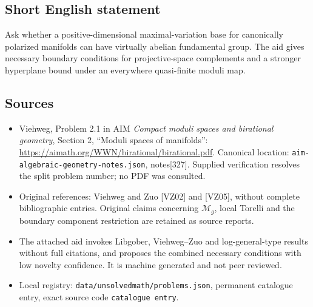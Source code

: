 \documentclass[11pt]{article}
\begin{document}
\subsection{Short English statement}
Ask whether a positive-dimensional maximal-variation base for canonically polarized manifolds can have virtually abelian fundamental group. The aid gives necessary boundary conditions for projective-space complements and a stronger hyperplane bound under an everywhere quasi-finite moduli map.
\subsection{Sources}
\begin{itemize}
\item Viehweg, Problem 2.1 in AIM \emph{Compact moduli spaces and birational geometry}, Section 2, ``Moduli spaces of manifolds'': \url{https://aimath.org/WWN/birational/birational.pdf}. Canonical location: \texttt{aim-algebraic-geometry-notes.json}, notes[327]. Supplied verification resolves the split problem number; no PDF was consulted.
\item Original references: Viehweg and Zuo [VZ02] and [VZ05], without complete bibliographic entries. Original claims concerning $\mathcal M_g$, local Torelli and the boundary component restriction are retained as source reports.
\item The attached aid invokes Libgober, Viehweg--Zuo and log-general-type results without full citations, and proposes the combined necessary conditions with low novelty confidence. It is machine generated and not peer reviewed.
\item Local registry: \texttt{data/unsolvedmath/problems.json}, permanent catalogue entry, exact source code \texttt{catalogue entry}.
\end{itemize}
\end{document}
